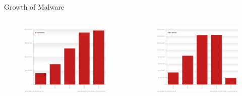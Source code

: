 \documentclass{beamer}
\begin{document}
\begin{frame}[plain]{Growth of Malware}
  \begin{columns}
    \begin{column}{5cm}
      \begin{figure}[H]
        \begin{center}
          \includegraphics[scale=0.18]{figures/malware_all.png}
        \end{center}
      \end{figure}
    \end{column}
    \begin{column}{5cm}
      \begin{figure}[H]
        \begin{center}
          \includegraphics[scale=0.18]{figures/malware_new.png}

\end{center}
\end{figure}
\end{column}
\end{columns}
\end{frame}
\end{document}
